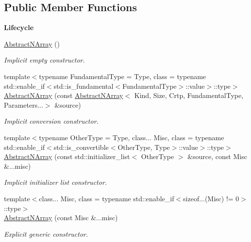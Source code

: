 \subsection*{Public Member Functions}
\begin{Indent}{\bf Lifecycle}\par
\begin{DoxyCompactItemize}
\item 
\hyperlink{classmagrathea_1_1AbstractNArray_a411d3215457a0b6f89920c1d13da8563}{Abstract\-N\-Array} ()
\begin{DoxyCompactList}\small\item\em Implicit empty constructor. \end{DoxyCompactList}\item 
{\footnotesize template$<$typename Fundamental\-Type  = Type, class  = typename std\-::enable\-\_\-if$<$std\-::is\-\_\-fundamental$<$\-Fundamental\-Type$>$\-::value$>$\-::type$>$ }\\\hyperlink{classmagrathea_1_1AbstractNArray_afa10ddc178555f466782fafcfe9362cb}{Abstract\-N\-Array} (const \hyperlink{classmagrathea_1_1AbstractNArray}{Abstract\-N\-Array}$<$ Kind, Size, Crtp, Fundamental\-Type, Parameters...$>$ \&source)
\begin{DoxyCompactList}\small\item\em Implicit conversion constructor. \end{DoxyCompactList}\item 
{\footnotesize template$<$typename Other\-Type  = Type, class... Misc, class  = typename std\-::enable\-\_\-if$<$std\-::is\-\_\-convertible$<$\-Other\-Type, Type$>$\-::value$>$\-::type$>$ }\\\hyperlink{classmagrathea_1_1AbstractNArray_ab8eca034b95c643337e5ad765ab701ce}{Abstract\-N\-Array} (const std\-::initializer\-\_\-list$<$ Other\-Type $>$ \&source, const Misc \&...misc)
\begin{DoxyCompactList}\small\item\em Implicit initializer list constructor. \end{DoxyCompactList}\item 
{\footnotesize template$<$class... Misc, class  = typename std\-::enable\-\_\-if$<$sizeof...(\-Misc) != 0$>$\-::type$>$ }\\\hyperlink{classmagrathea_1_1AbstractNArray_a38612c4f4779eefaf6e769b309a8ed10}{Abstract\-N\-Array} (const Misc \&...misc)
\begin{DoxyCompactList}\small\item\em Explicit generic constructor. \end{DoxyCompactList}\end{DoxyCompactItemize}
\end{Indent}
